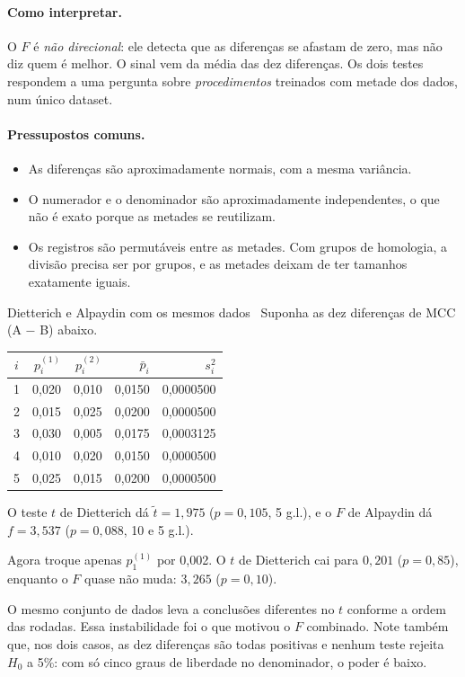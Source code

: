 \documentclass[11pt,a4paper]{article}
\newcommand{\etiqueta}[2]{\tcbox[on line, colback=#1!10, colframe=#1!75!black,
  boxrule=0.4pt, arc=1.2pt, left=1.5pt, right=1.5pt, top=0pt, bottom=0pt,
  fontupper=\sffamily\scriptsize\bfseries]{#2}}
\newcommand{\fic}{\etiqueta{oiPurple}{Fictício}}
\begin{document}
\paragraph{Como interpretar.} O $F$ é \emph{não direcional}: ele detecta que as diferenças se afastam de zero, mas não diz quem é melhor. O sinal vem da média das dez diferenças. Os dois testes respondem a uma pergunta sobre \emph{procedimentos} treinados com metade dos dados, num único dataset.

\paragraph{Pressupostos comuns.}
\begin{itemize}[leftmargin=1.4em]
\item As diferenças são aproximadamente normais, com a mesma variância.
\item O numerador e o denominador são aproximadamente independentes, o que não é exato porque as metades se reutilizam.
\item Os registros são permutáveis entre as metades. Com grupos de homologia, a divisão precisa ser por grupos, e as metades deixam de ter tamanhos exatamente iguais.
\end{itemize}

\begin{exemplo}{Dietterich e Alpaydin com os mesmos dados}
\fic\ Suponha as dez diferenças de MCC (A $-$ B) abaixo.
\begin{center}\small
\begin{tabular}{crrrr}
\toprule
$i$ & $p_i^{(1)}$ & $p_i^{(2)}$ & $\bar{p}_i$ & $s_i^2$\\
\midrule
1 & 0,020 & 0,010 & 0,0150 & 0,0000500\\
2 & 0,015 & 0,025 & 0,0200 & 0,0000500\\
3 & 0,030 & 0,005 & 0,0175 & 0,0003125\\
4 & 0,010 & 0,020 & 0,0150 & 0,0000500\\
5 & 0,025 & 0,015 & 0,0200 & 0,0000500\\
\bottomrule
\end{tabular}
\end{center}
O teste $t$ de Dietterich dá $\tilde{t}=1{,}975$ ($p=0{,}105$, 5 g.l.), e o $F$ de Alpaydin dá $f=3{,}537$ ($p=0{,}088$, 10 e 5 g.l.).

Agora troque apenas $p_1^{(1)}$ por 0,002. O $t$ de Dietterich cai para $0{,}201$ ($p=0{,}85$), enquanto o $F$ quase não muda: $3{,}265$ ($p=0{,}10$).

O mesmo conjunto de dados leva a conclusões diferentes no $t$ conforme a ordem das rodadas. Essa instabilidade foi o que motivou o $F$ combinado. Note também que, nos dois casos, as dez diferenças são todas positivas e nenhum teste rejeita $H_0$ a 5\%: com só cinco graus de liberdade no denominador, o poder é baixo.
\end{exemplo}
\end{document}
